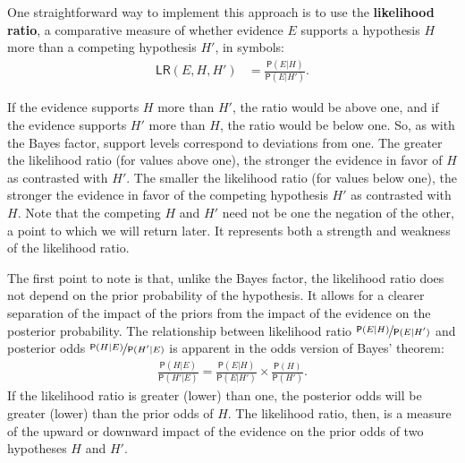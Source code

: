 \documentclass[
  10pt,
  dvipsnames,enabledeprecatedfontcommands]{scrartcl}
\newcommand{\pr}[1]{\mathsf{P}(#1)}
\begin{document}
One straightforward way to implement this approach is to use the
\textbf{likelihood ratio}, a comparative measure of whether evidence
\(E\) supports a hypothesis \(H\) more than a competing hypothesis
\(H'\), in symbols: \begin{align}
\label{eq:LR}
\tag{LR}
\mathsf{LR}(E,H,H') & = \frac{\pr{E \vert H}}{\pr{E \vert H'}}.
\end{align}

\noindent If the evidence supports \(H\) more than \(H'\), the ratio
would be above one, and if the evidence supports \(H'\) more than \(H\),
the ratio would be below one. So, as with the Bayes factor, support
levels correspond to deviations from one. The greater the likelihood
ratio (for values above one), the stronger the evidence in favor of
\(H\) as contrasted with \(H'\). The smaller the likelihood ratio (for
values below one), the stronger the evidence in favor of the competing
hypothesis \(H'\) as contrasted with \(H\). Note that the competing
\(H\) and \(H'\) need not be one the negation of the other, a point to
which we will return later. It represents both a strength and weakness
of the likelihood ratio.

The first point to note is that, unlike the Bayes factor, the likelihood
ratio does not depend on the prior probability of the hypothesis. It
allows for a clearer separation of the impact of the priors from the
impact of the evidence on the posterior probability. The relationship
between likelihood ratio \(\nicefrac{\pr{E \vert H}}{\pr{E \vert H'}}\)
and posterior odds \(\nicefrac{\pr{H \vert E}}{\pr{H' \vert E}}\) is
apparent in the odds version of Bayes' theorem:
\begin{align}\label{eq:BTodds}
\frac{\pr{H \vert E}}{\pr{H' \vert E}}= \frac{\pr{E \vert H}}{\pr{E \vert H'}}\times \frac{\pr{H}}{\pr{H'}}.
\end{align} \noindent If the likelihood ratio is greater (lower) than
one, the posterior odds will be greater (lower) than the prior odds of
\(H\). The likelihood ratio, then, is a measure of the upward or
downward impact of the evidence on the prior odds of two hypotheses
\(H\) and \(H'\).
\end{document}
